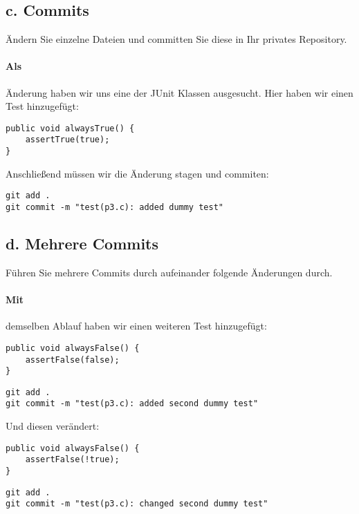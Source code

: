 \subsection{c. Commits}\label{subsec:c.-commits}
Ändern Sie einzelne Dateien und committen Sie diese in Ihr privates Repository.

\paragraph{Als} Änderung haben wir uns eine der JUnit Klassen ausgesucht.
Hier haben wir einen Test hinzugefügt:
\begin{lstlisting}[label={lst:true-test}, caption={Abgeänderter Testfall 1}]
public void alwaysTrue() {
    assertTrue(true);
}
\end{lstlisting}

Anschließend müssen wir die Änderung stagen und commiten:
\begin{lstlisting}[label={lst:commit-true-test}, caption={Committen von Testfall 1}]
git add .
git commit -m "test(p3.c): added dummy test"
\end{lstlisting}

\subsection{d. Mehrere Commits}\label{subsec:d.-mehrere-commits}
Führen Sie mehrere Commits durch aufeinander folgende Änderungen durch.

\paragraph{Mit} demselben Ablauf haben wir einen weiteren Test hinzugefügt:
\begin{lstlisting}[label={lst:false-test}, caption={Abgeänderter Testfall 2}]
public void alwaysFalse() {
    assertFalse(false);
}
\end{lstlisting}

\begin{lstlisting}[label={lst:commit-false-test}, caption={Committen von Testfall 2}]
git add .
git commit -m "test(p3.c): added second dummy test"
\end{lstlisting}

Und diesen verändert:
\begin{lstlisting}[label={lst:inverted-true-test}, caption={Abgeänderter Testfall 3}]
public void alwaysFalse() {
    assertFalse(!true);
}
\end{lstlisting}
\begin{lstlisting}[label={lst:commit-inverted-true-test}, caption={Committen von Testfall 3}]
git add .
git commit -m "test(p3.c): changed second dummy test"
\end{lstlisting}

